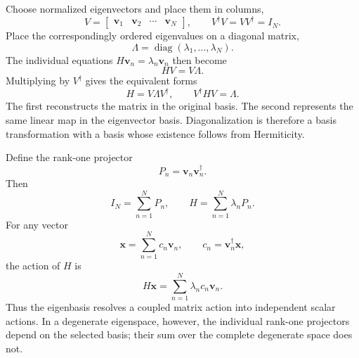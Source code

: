 Choose normalized eigenvectors and place them in columns,
\begin{equation}
  V=
  \begin{bmatrix}
    \mathbf v_1 & \mathbf v_2 & \cdots & \mathbf v_N
  \end{bmatrix},
  \qquad
  V^{\dagger}V=VV^{\dagger}=I_N.
  \label{eq:training-eigenvector-matrix}
\end{equation}
Place the correspondingly ordered eigenvalues on a diagonal matrix,
\begin{equation}
  \Lambda
  =\operatorname{diag}(\lambda_1,\ldots,\lambda_N).
  \label{eq:training-eigenvalue-matrix}
\end{equation}
The individual equations \(H\mathbf v_n=\lambda_n\mathbf v_n\) then become
\begin{equation}
  HV=V\Lambda.
  \label{eq:training-assembled-eigensystem}
\end{equation}
Multiplying by \(V^{\dagger}\) gives the equivalent forms
\begin{equation}
  H=V\Lambda V^{\dagger},
  \qquad
  V^{\dagger}HV=\Lambda.
  \label{eq:training-hermitian-diagonalization}
\end{equation}
The first reconstructs the matrix in the original basis. The second represents
the same linear map in the eigenvector basis. Diagonalization is therefore a
basis transformation with a basis whose existence follows from Hermiticity.

Define the rank-one projector
\begin{equation}
  P_n=\mathbf v_n\mathbf v_n^{\dagger}.
\end{equation}
Then
\begin{equation}
  I_N=\sum_{n=1}^{N}P_n,
  \qquad
  H=\sum_{n=1}^{N}\lambda_nP_n.
  \label{eq:training-rank-one-spectral-decomposition}
\end{equation}
For any vector
\begin{equation}
  \mathbf x=\sum_{n=1}^{N}c_n\mathbf v_n,
  \qquad
  c_n=\mathbf v_n^{\dagger}\mathbf x,
\end{equation}
the action of \(H\) is
\begin{equation}
  H\mathbf x=\sum_{n=1}^{N}\lambda_nc_n\mathbf v_n.
\end{equation}
Thus the eigenbasis resolves a coupled matrix action into independent scalar
actions. In a degenerate eigenspace, however, the individual rank-one
projectors depend on the selected basis; their sum over the complete degenerate
space does not.

